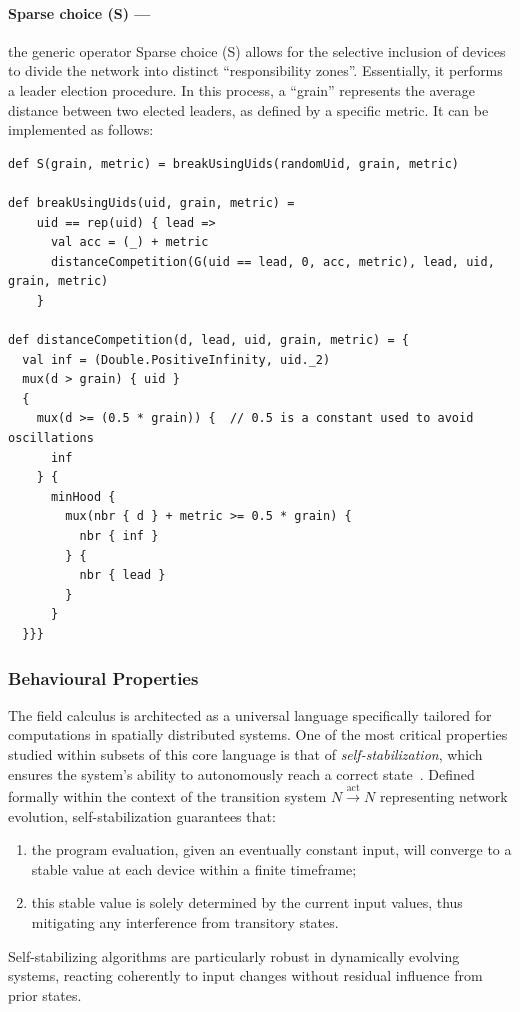 \paragraph*{Sparse choice (S) --- }
the generic operator Sparse choice (S) 
 allows for the selective inclusion of devices to divide the network into distinct ``responsibility zones''. Essentially, it performs a leader election procedure. 
 In this process, a ``grain'' represents the average distance between two elected leaders, as defined by a specific metric. It can be implemented as follows:
\begin{lstlisting}[language=scafi]
def S(grain, metric) = breakUsingUids(randomUid, grain, metric)

def breakUsingUids(uid, grain, metric) =
    uid == rep(uid) { lead =>
      val acc = (_) + metric
      distanceCompetition(G(uid == lead, 0, acc, metric), lead, uid, grain, metric)
    }

def distanceCompetition(d, lead, uid, grain, metric) = {
  val inf = (Double.PositiveInfinity, uid._2)
  mux(d > grain) { uid }
  {
    mux(d >= (0.5 * grain)) {  // 0.5 is a constant used to avoid oscillations
      inf 
    } {
      minHood {
        mux(nbr { d } + metric >= 0.5 * grain) { 
          nbr { inf } 
        } { 
          nbr { lead } 
        }
      }
  }}}
\end{lstlisting}

\subsubsection{Behavioural Properties}\label{sec:field-calculus-behavioural-properties}
The field calculus is architected as a universal language specifically tailored for computations in spatially distributed systems. 
 One of the most critical properties studied within subsets of this core language is that of \emph{self-stabilization}, 
 which ensures the system's ability to autonomously reach a correct state~\cite{lafuente2015fixpoint}.%
 Defined formally within the context of the transition system \( N \stackrel{\text{act}}{\rightarrow} N \) representing network evolution, self-stabilization guarantees that:
\begin{enumerate}
    \item the program evaluation, given an eventually constant input, 
    will converge to a stable value at each device within a finite timeframe;
    \item this stable value is solely determined by the current input values, 
    thus mitigating any interference from transitory states.
\end{enumerate}
Self-stabilizing algorithms are particularly robust in dynamically evolving systems, 
 reacting coherently to input changes without residual influence from prior states.

